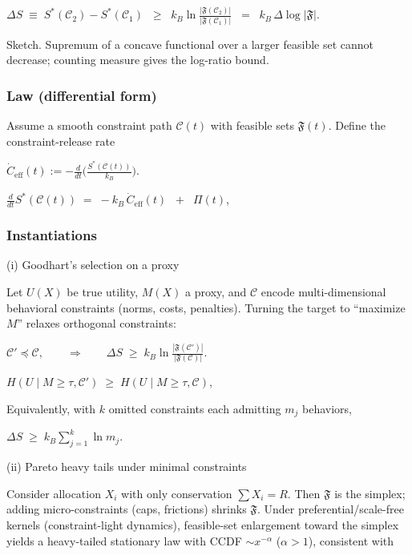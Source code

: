 \documentclass{article}
\begin{document}
$\Delta S \;\equiv\; S^*(\mathcal{C}_2) - S^*(\mathcal{C}_1) 
\;\;\ge\;\; k_B \ln \frac{|\mathfrak{F}(\mathcal{C}_2)|}{|\mathfrak{F}(\mathcal{C}_1)|}
\;\;=\;\; k_B\,\Delta \log |\mathfrak{F}|$.

Sketch. Supremum of a concave functional over a larger feasible set cannot decrease; counting measure gives the log-ratio bound.

\subsubsection{Law (differential form)}

Assume a smooth constraint path $\mathcal{C}(t)$ with feasible sets $\mathfrak{F}(t)$. Define the constraint-release rate

$\dot C_{\mathrm{eff}}(t) := -\frac{d}{dt}\Big(\frac{S^*(\mathcal{C}(t))}{k_B}\Big)$.

$\frac{d}{dt} S^*(\mathcal{C}(t)) \;=\; -k_B\,\dot C_{\mathrm{eff}}(t) \;\;+\;\; \Pi(t)$,

\subsubsection{Instantiations}

(i) Goodhart’s selection on a proxy

Let $U(X)$ be true utility, $M(X)$ a proxy, and $\mathcal{C}$ encode multi-dimensional behavioral constraints (norms, costs, penalties). Turning the target to “maximize $M$” relaxes orthogonal constraints:

$\mathcal{C}' \preceq \mathcal{C}, \qquad \Rightarrow \qquad \Delta S \;\ge\; k_B \ln \frac{|\mathfrak{F}(\mathcal{C}')|}{|\mathfrak{F}(\mathcal{C})|}$.

$H(U\mid M\ge \tau, \mathcal{C}') \;\ge\; H(U\mid M\ge \tau, \mathcal{C})$,

Equivalently, with $k$ omitted constraints each admitting $m_j$ behaviors,

$\Delta S \;\ge\; k_B \sum_{j=1}^k \ln m_j $.

(ii) Pareto heavy tails under minimal constraints

Consider allocation $X_i$ with only conservation $\sum X_i=R$. Then $\mathfrak{F}$ is the simplex; adding micro-constraints (caps, frictions) shrinks $\mathfrak{F}$. Under preferential/scale-free kernels (constraint-light dynamics), feasible-set enlargement toward the simplex yields a heavy-tailed stationary law with CCDF $\sim x^{-\alpha}$ ($\alpha>1$), consistent with
\end{document}
